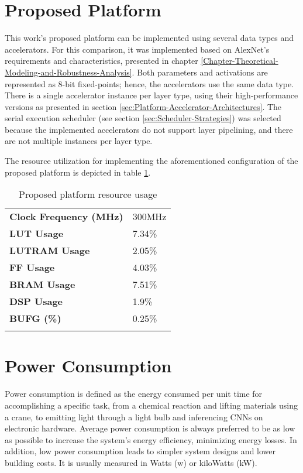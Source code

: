 \section{Proposed Platform}
\label{sec:proposed-platform-implementation}
This work's proposed platform can be implemented using several data types and accelerators. For this comparison, it was implemented based on AlexNet's requirements and characteristics, presented in chapter \ref{Chapter-Theoretical-Modeling-and-Robustness-Analysis}. Both parameters and activations are represented as 8-bit fixed-points; hence, the accelerators use the same data type. There is a single accelerator instance per layer type, using their high-performance versions as presented in section \ref{sec:Platform-Accelerator-Architectures}. The serial execution scheduler (see section \ref{sec:Scheduler-Strategies}) was selected because the implemented accelerators do not support layer pipelining, and there are not multiple instances per layer type.

The resource utilization for implementing the aforementioned configuration of the proposed platform is depicted in table \ref{tab:Proposed-platform-resource-usage}.

\begin{table}[H]
	\caption{Proposed platform resource usage}
	\label{tab:Proposed-platform-resource-usage}
	\centering
	\begin{tabular}{ll}
		\toprule
		\textbf{Clock Frequency (MHz)} & 300MHz\\
		\textbf{LUT Usage} & 7.34\%\\
		\textbf{LUTRAM Usage} & 2.05\%\\
		\textbf{FF Usage} & 4.03\%\\
		\textbf{BRAM Usage} & 7.51\%\\
		\textbf{DSP Usage} & 1.9\%\\
		\textbf{BUFG (\%)} & 0.25\%\\
		\bottomrule\\
	\end{tabular}
\end{table}

\section{Power Consumption}
Power consumption is defined as the energy consumed per unit time for accomplishing a specific task, from a chemical reaction and lifting materials using a crane, to emitting light through a light bulb and inferencing CNNs on electronic hardware. Average power consumption is always preferred to be as low as possible to increase the system's energy efficiency, minimizing energy losses. In addition, low power consumption leads to simpler system designs and lower building costs. It is usually measured in Watts (w) or kiloWatts (kW).

